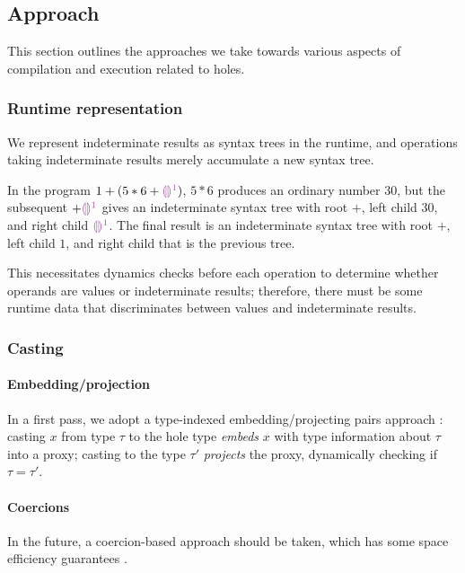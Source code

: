 \documentclass[index.tex]{subfiles}
\begin{document}
\subsection{Approach}
\label{approach}
This section outlines the approaches we take towards various aspects of compilation and execution
related to holes.

\subsubsection{Runtime representation}
\label{runtime-representation}
We represent indeterminate results as syntax trees in the runtime, and operations taking
indeterminate results merely accumulate a new syntax tree.
%
\begin{example}
  In the program $1 + (5 * 6 + \SyEHole{1}{})$, $5 * 6$ produces an ordinary number $30$, but the
  subsequent $+ \SyEHole{1}{}$ gives an indeterminate syntax tree with root $+$, left child $30$, and
  right child $\SyEHole{1}{}$. The final result is an indeterminate syntax tree with root $+$, left
  child $1$, and right child that is the previous tree.
\end{example}
%
\noindent This necessitates dynamics checks before each operation to determine whether operands are
values or indeterminate results; therefore, there must be some runtime data that discriminates
between values and indeterminate results.

\subsubsection{Casting}
\label{casting}

\paragraph{Embedding/projection}
In a first pass, we adopt a type-indexed embedding/projecting pairs approach \cite{new2018}: casting
$x$ from type $\tau$ to the hole type \emph{embeds} $x$ with type information about $\tau$ into a proxy;
casting to the type $\tau'$ \emph{projects} the proxy, dynamically checking if $\tau = \tau'$.

\paragraph{Coercions}
In the future, a coercion-based approach should be taken, which has some space efficiency guarantees
\cite{herman2010, kuhlenschmidt2019}.
\end{document}
